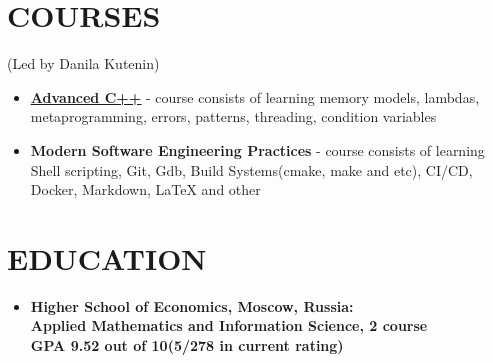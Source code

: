 \documentclass[paper=a4,fontsize=15pt]{scrartcl} %
\newcommand{\NewPart}[2]{\section*{\uppercase{#1} \small \normalfont #2}}
\begin{document}
\NewPart{Courses}{}(Led by Danila Kutenin)

\begin{itemize}
  \item \textbf{\href{https://github.com/DenisOstashov/cpp-advanced-hse}{\underline{Advanced C++}}} - course consists of learning memory models, lambdas, metaprogramming, errors, patterns, threading, condition variables
  
 \item \textbf{Modern Software Engineering Practices} - course consists of learning Shell scripting, Git, Gdb, Build Systems(cmake, make and etc), CI/CD, Docker, Markdown, LaTeX and other
  
\end{itemize}


\NewPart{Education}{}

\begin{itemize}

\item \textbf{Higher School of Economics, Moscow, Russia:\\Applied Mathematics and Information Science, 2 course\\GPA 9.52 out of 10(5/278 in	current rating)} 
\end{itemize}
\end{document}
